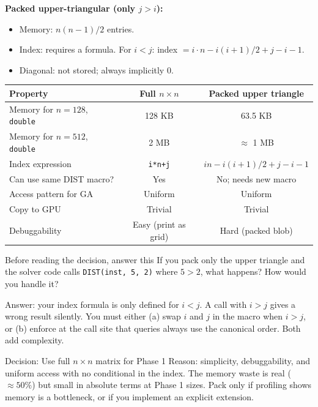\textbf{Packed upper-triangular (only $j > i$):}
\begin{itemize}
  \item Memory: $n(n-1)/2$ entries.
  \item Index: requires a formula. For $i < j$: index $= i \cdot n - i(i+1)/2 + j - i - 1$.
  \item Diagonal: not stored; always implicitly 0.
\end{itemize}

\begin{center}
\renewcommand{\arraystretch}{1.5}
\begin{tabular}{lcc}
\toprule
Property & Full $n \times n$ & Packed upper triangle \\
\midrule
Memory for $n=128$, \texttt{double} & 128 KB & 63.5 KB \\
Memory for $n=512$, \texttt{double} & 2 MB & $\approx$ 1 MB \\
Index expression & \texttt{i*n+j} & $in - i(i+1)/2 + j - i - 1$ \\
Can use same DIST macro? & Yes & No; needs new macro \\
Access pattern for GA & Uniform & Uniform \\
Copy to GPU & Trivial & Trivial \\
Debuggability & Easy (print as grid) & Hard (packed blob) \\
\bottomrule
\end{tabular}
\end{center}

\begin{inquiry}{Before reading the decision, answer this}
If you pack only the upper triangle and the solver code calls \texttt{DIST(inst, 5, 2)} where $5 > 2$, what happens? How would you handle it?
\end{inquiry}

Answer: your index formula is only defined for $i < j$. A call with $i > j$ gives a wrong result silently. You must either (a) swap $i$ and $j$ in the macro when $i > j$, or (b) enforce at the call site that queries always use the canonical order. Both add complexity.

\begin{goodbox}{Decision: Use full $n \times n$ matrix for Phase 1}
Reason: simplicity, debuggability, and uniform access with no conditional in the index. The memory waste is real ($\approx 50\%$) but small in absolute terms at Phase 1 sizes. Pack only if profiling shows memory is a bottleneck, or if you implement an explicit extension.
\end{goodbox}

